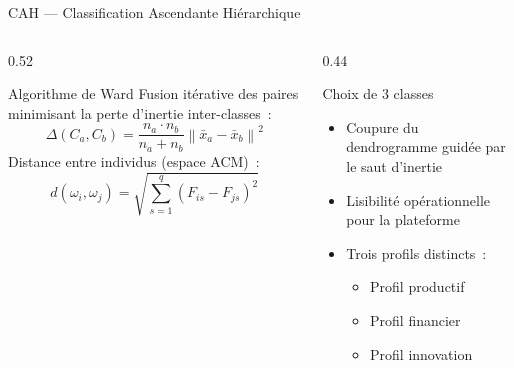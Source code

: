 \documentclass[aspectratio=169, 10pt]{beamer}
\begin{document}
\begin{frame}{CAH — Classification Ascendante Hiérarchique}
    \begin{columns}[T]
        \begin{column}{0.52\textwidth}
            \begin{block}{Algorithme de Ward}
                Fusion itérative des paires minimisant la
                perte d'inertie inter-classes~:
                \[
                    \Delta(C_a, C_b)
                    = \frac{n_a \cdot n_b}{n_a + n_b}
                      \left\|\bar{x}_a - \bar{x}_b\right\|^2
                \]
                Distance entre individus (espace ACM)~:
                \[
                    d(\omega_i, \omega_j)
                    = \sqrt{\sum_{s=1}^{q}(F_{is} - F_{js})^2}
                \]
            \end{block}
        \end{column}
        \begin{column}{0.44\textwidth}
            \begin{exampleblock}{Choix de 3 classes}
                \begin{itemize}
                    \item Coupure du dendrogramme
                          guidée par le saut d'inertie
                    \item Lisibilité opérationnelle
                          pour la plateforme
                    \item Trois profils distincts~:
                          \begin{itemize}
                              \item[\textbullet] Profil productif
                              \item[\textbullet] Profil financier
                              \item[\textbullet] Profil innovation
                          \end{itemize}
                \end{itemize}
            \end{exampleblock}
        \end{column}
    \end{columns}
\end{frame}
\end{document}
